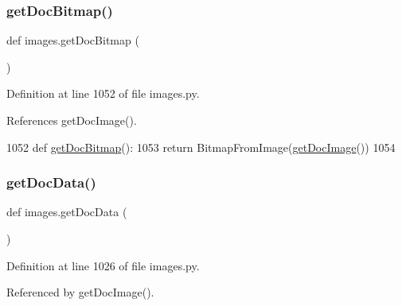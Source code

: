 \subsubsection{\texorpdfstring{get\+Doc\+Bitmap()}{getDocBitmap()}}
{\footnotesize\ttfamily def images.\+get\+Doc\+Bitmap (\begin{DoxyParamCaption}{ }\end{DoxyParamCaption})}



Definition at line 1052 of file images.\+py.



References get\+Doc\+Image().


\begin{DoxyCode}
1052 \textcolor{keyword}{def }\hyperlink{namespaceimages_a633a6f08f408fa61efd87082b30a729b}{getDocBitmap}():
1053     \textcolor{keywordflow}{return} BitmapFromImage(\hyperlink{namespaceimages_a3f894481ce4bf93e759ae2435f904776}{getDocImage}())
1054 
\end{DoxyCode}
\mbox{\label{namespaceimages_a1e1aebcf5b98a65f95e4511e03d9f631}} 
\subsubsection{\texorpdfstring{get\+Doc\+Data()}{getDocData()}}
{\footnotesize\ttfamily def images.\+get\+Doc\+Data (\begin{DoxyParamCaption}{ }\end{DoxyParamCaption})}



Definition at line 1026 of file images.\+py.



Referenced by get\+Doc\+Image().


